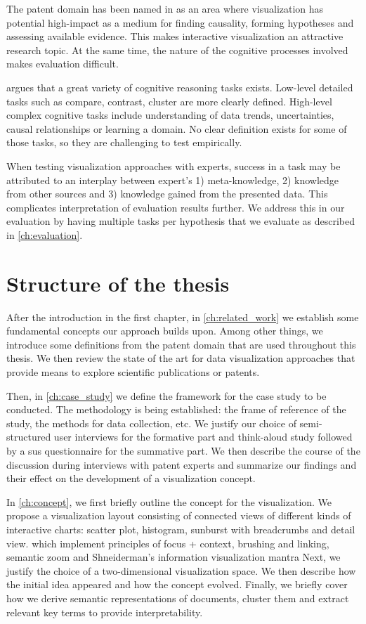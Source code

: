 The patent domain has been named in \cite{Chen2005} as an area where visualization has potential high-impact as a medium for finding causality, forming hypotheses and assessing available evidence.
This makes interactive visualization an attractive research topic. 
At the same time, the nature of the cognitive processes involved makes evaluation difficult.

\cite{Carpendale2008} argues that a great variety of cognitive reasoning tasks exists.
Low-level detailed tasks such as compare, contrast, cluster are more clearly defined.
High-level complex cognitive tasks include understanding of data trends, uncertainties, causal relationships or learning a domain.
No clear definition exists for some of those tasks, so they are challenging to test empirically.

When testing visualization approaches with experts, success in a task may be attributed to an interplay between expert's 1) meta-knowledge, 2) knowledge from other sources and 3) knowledge gained from the presented data.
This complicates interpretation of evaluation results further.
We address this in our evaluation by having multiple tasks per hypothesis that we evaluate as described in \autoref{ch:evaluation}.

\section{Structure of the thesis}
\label{sec:structure_of_thesis}

After the introduction in the first chapter, in \autoref{ch:related_work} we establish some fundamental concepts our approach builds upon.
Among other things, we introduce some definitions from the patent domain that are used throughout this thesis.
We then review the state of the art for data visualization approaches that provide means to explore scientific publications or patents.

Then, in \autoref{ch:case_study} we define the framework for the case study to be conducted.
The methodology is being established: the frame of reference of the study, the methods for data collection, etc.
We justify our choice of semi-structured user interviews for the formative part and think-aloud study followed by a \gls{sus} questionnaire for the summative part.
We then describe the course of the discussion during interviews with patent experts and summarize our findings and their effect on the development of a visualization concept.

In \autoref{ch:concept}, we first briefly outline the concept for the visualization.
We propose a visualization layout consisting of connected views of different kinds of interactive charts: scatter plot, histogram, sunburst with breadcrumbs and detail view.
which implement principles of focus + context, brushing and linking, semantic zoom and Shneiderman's information visualization mantra
Next, we justify the choice of a two-dimensional visualization space.
We then describe how the initial idea appeared and how the concept evolved.
Finally, we briefly cover how we derive semantic representations of documents, cluster them and extract relevant key terms to provide interpretability.

